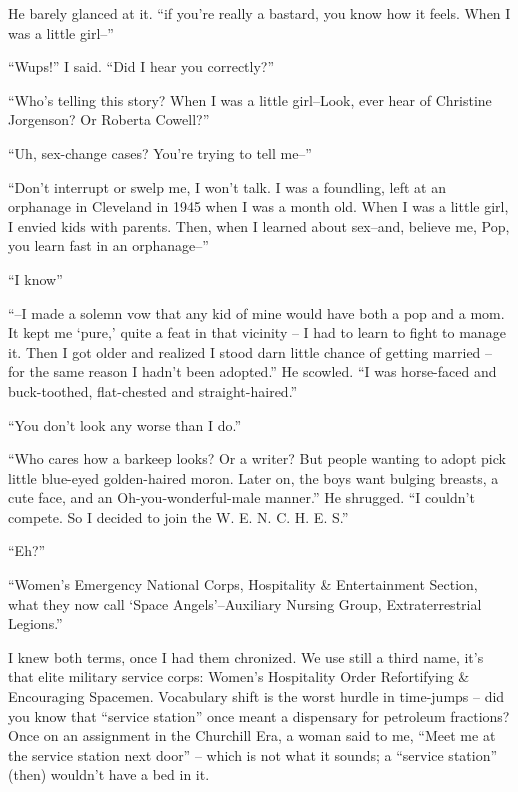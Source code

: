 He barely glanced at it. ``if you're really a bastard,
you know how it feels. When I was a little girl--''

``Wups!'' I said. ``Did I hear you correctly?''

``Who's  telling  this  story?  When  I  was  a  little
girl--Look, ever hear of Christine Jorgenson? Or Roberta Cowell?''

``Uh, sex-change cases? You're trying to tell me--''

``Don't interrupt or swelp me, I won't  talk.  I  was  a
foundling, left at an orphanage in Cleveland in 1945 when I was
a  month  old.  When  I  was  a little girl, I envied kids with
parents. Then, when I learned about sex--and, believe  me,  Pop,
you learn fast in an orphanage--''

``I know''

``--I  made  a solemn vow that any kid of mine would have
both a pop and a mom. It kept me `pure,' quite a feat in  that
vicinity -- I  had  to learn to fight to manage it. Then I got
older and realized  I  stood  darn  little  chance  of  getting
married -- for  the  same  reason I hadn't been adopted.'' He
scowled. ``I was horse-faced and buck-toothed, flat-chested and
straight-haired.''

``You don't look any worse than I do.''

``Who cares how a barkeep looks? Or a writer? But people
wanting to  adopt  pick  little  blue-eyed golden-haired moron.
Later on, the boys want bulging breasts, a cute  face,  and  an
Oh-you-wonderful-male manner.''  He shrugged.  ``I  couldn't
compete. So I decided to join the W. E. N. C. H. E. S.''

``Eh?''

``Women's  Emergency  National  Corps,   Hospitality \&
Entertainment    Section,    what    they   now   call `Space
Angels'--Auxiliary Nursing Group, Extraterrestrial Legions.''

I knew both terms, once I had them  chronized.  We  use
still  a  third  name,  it's that elite military service corps:
Women's Hospitality Order Refortifying \& Encouraging  Spacemen.
Vocabulary  shift  is  the worst hurdle in time-jumps -- did you
know  that  ``service  station''  once meant a dispensary for petroleum
fractions? Once  on   an assignment  in the Churchill Era, a woman said to me,
``Meet me at the service station next door'' --  which  is  not  what  it
sounds; a ``service station'' (then) wouldn't have a bed in it.

